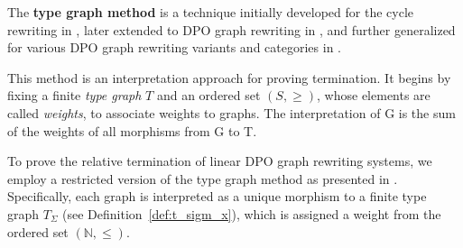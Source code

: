 
The \textbf{type graph method} is a technique initially developed for the cycle rewriting in \cite{zantema2014termination}, later extended to DPO graph rewriting in \cite{bruggink2014termination, bruggink2015proving}, and further generalized for various DPO graph rewriting variants and categories in \cite{endrullis2023generalized}.

This method is an interpretation approach \cite[see][]{nipkow1998term} for proving termination. It begins by fixing a finite \emph{type graph} \(T\) and an ordered set \((S, \mathop{\geq})\), whose elements are called \emph{weights}, to associate weights to graphs. The interpretation of G is the sum of the weights of all morphisms from G to T.


To prove the relative termination of linear DPO graph rewriting systems, we employ a restricted version of the type graph method as presented in \cite{endrullis2023generalized}. Specifically, each graph is interpreted as a unique morphism to a finite type graph \( T_\Sigma \) (see Definition~\ref{def:t_sigm_x}), which is assigned a weight from the ordered set \((\mathbb{N}, \leq)\).

